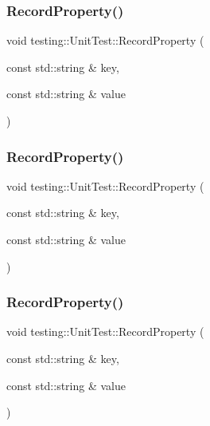 \subsubsection{\texorpdfstring{RecordProperty()}{RecordProperty()}\hspace{0.1cm}{\footnotesize\ttfamily [1/3]}}
{\footnotesize\ttfamily void testing\+::\+Unit\+Test\+::\+Record\+Property (\begin{DoxyParamCaption}\item[{const std\+::string \&}]{key,  }\item[{const std\+::string \&}]{value }\end{DoxyParamCaption})\hspace{0.3cm}{\ttfamily [private]}}

\mbox{\label{classtesting_1_1_unit_test_a2c96a4a02c34095e07c6999e7686367f}} 
\subsubsection{\texorpdfstring{RecordProperty()}{RecordProperty()}\hspace{0.1cm}{\footnotesize\ttfamily [2/3]}}
{\footnotesize\ttfamily void testing\+::\+Unit\+Test\+::\+Record\+Property (\begin{DoxyParamCaption}\item[{const std\+::string \&}]{key,  }\item[{const std\+::string \&}]{value }\end{DoxyParamCaption})\hspace{0.3cm}{\ttfamily [private]}}

\mbox{\label{classtesting_1_1_unit_test_a2c96a4a02c34095e07c6999e7686367f}} 
\subsubsection{\texorpdfstring{RecordProperty()}{RecordProperty()}\hspace{0.1cm}{\footnotesize\ttfamily [3/3]}}
{\footnotesize\ttfamily void testing\+::\+Unit\+Test\+::\+Record\+Property (\begin{DoxyParamCaption}\item[{const std\+::string \&}]{key,  }\item[{const std\+::string \&}]{value }\end{DoxyParamCaption})\hspace{0.3cm}{\ttfamily [private]}}

